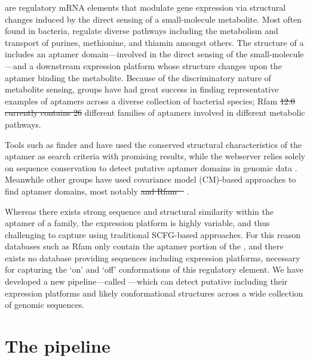 \documentclass[11pt, oneside]{Thesis} %
\providecommand{\DIFadd}[1]{{\protect\color{blue}\uwave{#1}}} %
\providecommand{\DIFdel}[1]{{\protect\color{red}\sout{#1}}}                      %
\providecommand{\DIFaddbegin}{} %
\providecommand{\DIFaddend}{} %
\providecommand{\DIFdelbegin}{} %
\providecommand{\DIFdelend}{} %
\begin{document}
\Rbs are regulatory mRNA elements that modulate gene expression via
structural changes induced by the direct sensing of a small-molecule metabolite.
Most often found in bacteria, \rbs regulate diverse pathways including the
metabolism and transport of purines, methionine, and thiamin amongst others. The
structure of a \rb includes an aptamer domain---involved in the direct
sensing of the small-molecule---and a downstream expression platform whose
structure changes upon the aptamer binding the metabolite. Because of the
discriminatory nature of metabolite sensing, groups have had great success in
finding representative examples of aptamers across a diverse collection of
bacterial species; Rfam \DIFdelbegin \DIFdel{12.0 currently contains 26 }\DIFdelend \DIFaddbegin \DIFadd{$12.0$ currently contains $26$ }\DIFaddend different families of aptamers
involved in different metabolic pathways.

Tools such as \Rb finder \citep{bengert2004} and 
\citep{chang:2009de} have used the conserved
structural characteristics of the aptamer as search criteria with promising
results, while the webserver  relies solely on sequence conservation
to detect putative aptamer domains in genomic data \citep{abreugoodger:2005hb}.
Meanwhile other groups have used covariance model (CM)-based approaches to find
aptamer domains, most notably  \citep{yao2006}\DIFdelbegin \DIFdel{and Rfam
\mbox{%
\citep{nawrocki:2014uy}}%
}\DIFdelend .

Whereas there exists strong sequence and
structural similarity within the aptamer of a \rb family, the expression
platform is highly variable, and thus challenging to capture using traditional
SCFG-based approaches. For this reason databases such as Rfam only contain the aptamer
portion of the \rb, and there exists no database providing sequences
including expression platforms, necessary for capturing the `on' and `off'
conformations of this regulatory element. We have developed a new
pipeline---called \rfinder---which can detect putative \rbs including their
expression platforms and likely conformational structures across a wide collection
of genomic sequences.

\section{The \rfinder pipeline}
\label{sec:rfinder:pipeline}
\end{document}
